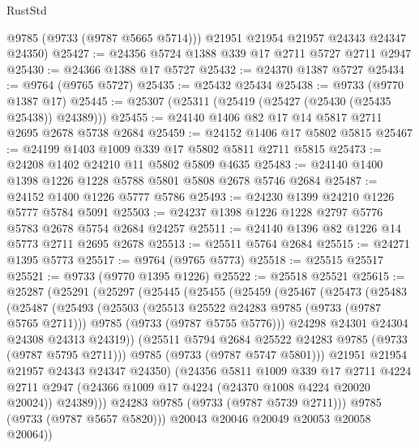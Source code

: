 \begin{lexlean}{RustStd}
\begin{coremodule}
{\begin{coremodule}
{{{{{{{{{{{{{{{{{{{{{{{{{{{{{{{{{{{{{{{{{{{{{{{{{{{{{{{        @9785
        (@9733 (@9787 @5665 @5714)))
      @21951
      @21954
      @21957
      @24343
      @24347
      @24350)
@25427 := @24356 @5724 @1388 @339 @17 @2711 @5727 @2711 @2947
@25430 := @24366 @1388 @17 @5727
@25432 := @24370 @1387 @5727
@25434 := @9764 (@9765 @5727)
@25435 := @25432 @25434
@25438 := @9733 (@9770 @1387 @17)
@25445 := @25307 (@25311 (@25419 (@25427 (@25430 (@25435 @25438)) @24389)))
@25455 := @24140 @1406 @82 @17 @14 @5817 @2711 @2695 @2678 @5738 @2684
@25459 := @24152 @1406 @17 @5802 @5815
@25467 := @24199 @1403 @1009 @339 @17 @5802 @5811 @2711 @5815
@25473 := @24208 @1402 @24210 @11 @5802 @5809 @4635
@25483 := @24140 @1400 @1398 @1226 @1228 @5788 @5801 @5808 @2678 @5746 @2684
@25487 := @24152 @1400 @1226 @5777 @5786
@25493 := @24230 @1399 @24210 @1226 @5777 @5784 @5091
@25503 := @24237 @1398 @1226 @1228 @2797 @5776 @5783 @2678 @5754 @2684 @24257
@25511 := @24140 @1396 @82 @1226 @14 @5773 @2711 @2695 @2678
@25513 := @25511 @5764 @2684
@25515 := @24271 @1395 @5773
@25517 := @9764 (@9765 @5773)
@25518 := @25515 @25517
@25521 := @9733 (@9770 @1395 @1226)
@25522 := @25518 @25521
@25615 := @25287
    (@25291
      (@25297
        (@25445
          (@25455
            (@25459
              (@25467
                (@25473
                  (@25483
                    (@25487
                      (@25493
                        (@25503
                          (@25513 @25522 @24283 @9785 (@9733 (@9787 @5765 @2711)))
                          @9785
                          (@9733 (@9787 @5755 @5776)))
                        @24298
                        @24301
                        @24304
                        @24308
                        @24313
                        @24319))
                    (@25511 @5794 @2684 @25522 @24283 @9785 (@9733 (@9787 @5795 @2711)))
                    @9785
                    (@9733 (@9787 @5747 @5801)))
                  @21951
                  @21954
                  @21957
                  @24343
                  @24347
                  @24350)
                (@24356
                  @5811
                  @1009
                  @339
                  @17
                  @2711
                  @4224
                  @2711
                  @2947
                  (@24366 @1009 @17 @4224 (@24370 @1008 @4224 @20020 @20024))
                  @24389)))
            @24283
            @9785
            (@9733 (@9787 @5739 @2711)))
          @9785
          (@9733 (@9787 @5657 @5820)))
        @20043
        @20046
        @20049
        @20053
        @20058
        @20064))
}}}}}}}}}}}}}}}}}}}}}}}}}}}}}}}}}}}}}}}}}}}}}}}}}}}}}}}
\end{coremodule}}
\end{coremodule}
\end{lexlean}
